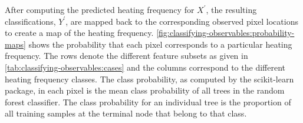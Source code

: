 After computing the predicted heating frequency for $X^\prime$, the resulting classifications, $Y^\prime$, are mapped back to the corresponding observed pixel locations to create a map of the heating frequency. \autoref{fig:classifying-observables:probability-maps} shows the probability that each pixel corresponds to a particular heating frequency. The rows denote the different feature subsets as given in \autoref{tab:classifying-observables:cases} and the columns correspond to the different heating frequency classes. The class probability, as computed by the scikit-learn package, in each pixel is the mean class probability of all trees in the random forest classifier. The class probability for an individual tree is the proportion of all training samples at the terminal node that belong to that class.

